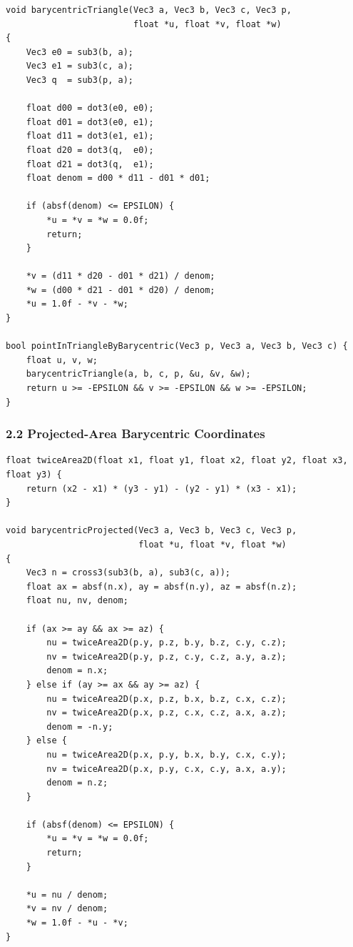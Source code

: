 \documentclass[10pt,letterpaper]{article}
\begin{document}
\begin{verbatim}
void barycentricTriangle(Vec3 a, Vec3 b, Vec3 c, Vec3 p,
                         float *u, float *v, float *w)
{
    Vec3 e0 = sub3(b, a);
    Vec3 e1 = sub3(c, a);
    Vec3 q  = sub3(p, a);

    float d00 = dot3(e0, e0);
    float d01 = dot3(e0, e1);
    float d11 = dot3(e1, e1);
    float d20 = dot3(q,  e0);
    float d21 = dot3(q,  e1);
    float denom = d00 * d11 - d01 * d01;

    if (absf(denom) <= EPSILON) {
        *u = *v = *w = 0.0f;
        return;
    }

    *v = (d11 * d20 - d01 * d21) / denom;
    *w = (d00 * d21 - d01 * d20) / denom;
    *u = 1.0f - *v - *w;
}

bool pointInTriangleByBarycentric(Vec3 p, Vec3 a, Vec3 b, Vec3 c) {
    float u, v, w;
    barycentricTriangle(a, b, c, p, &u, &v, &w);
    return u >= -EPSILON && v >= -EPSILON && w >= -EPSILON;
}
\end{verbatim}


\subsubsection*{2.2 Projected-Area Barycentric Coordinates}

\begin{verbatim}
float twiceArea2D(float x1, float y1, float x2, float y2, float x3, float y3) {
    return (x2 - x1) * (y3 - y1) - (y2 - y1) * (x3 - x1);
}

void barycentricProjected(Vec3 a, Vec3 b, Vec3 c, Vec3 p,
                          float *u, float *v, float *w)
{
    Vec3 n = cross3(sub3(b, a), sub3(c, a));
    float ax = absf(n.x), ay = absf(n.y), az = absf(n.z);
    float nu, nv, denom;

    if (ax >= ay && ax >= az) {
        nu = twiceArea2D(p.y, p.z, b.y, b.z, c.y, c.z);
        nv = twiceArea2D(p.y, p.z, c.y, c.z, a.y, a.z);
        denom = n.x;
    } else if (ay >= ax && ay >= az) {
        nu = twiceArea2D(p.x, p.z, b.x, b.z, c.x, c.z);
        nv = twiceArea2D(p.x, p.z, c.x, c.z, a.x, a.z);
        denom = -n.y;
    } else {
        nu = twiceArea2D(p.x, p.y, b.x, b.y, c.x, c.y);
        nv = twiceArea2D(p.x, p.y, c.x, c.y, a.x, a.y);
        denom = n.z;
    }

    if (absf(denom) <= EPSILON) {
        *u = *v = *w = 0.0f;
        return;
    }

    *u = nu / denom;
    *v = nv / denom;
    *w = 1.0f - *u - *v;
}
\end{verbatim}
\end{document}
